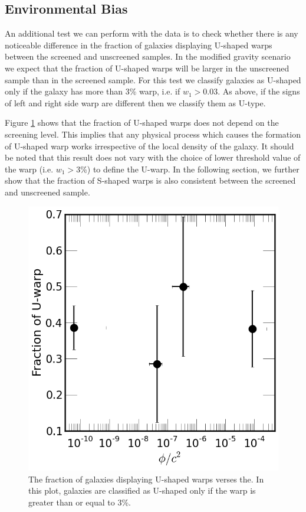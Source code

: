 \documentclass[useAMS,usenatbib,twocolumn]{mn2e}
\begin{document}
\subsection{Environmental Bias}
An additional test we can perform with the data is to check whether there is
any noticeable difference in the fraction of galaxies displaying
U-shaped warps between the screened and unscreened samples.
In the modified gravity scenario we expect
that the fraction of U-shaped warps will be larger in the unscreened sample
than in the screened sample. For this test we classify galaxies as U-shaped
only if the galaxy has more than 3\% warp, i.e. if
$w_1 > 0.03$. As above, if the signs of left and right side warp
are different then we classify them as U-type.

Figure \ref{fig:warp-stren-frac} shows that the fraction of U-shaped
warps does not depend on the screening level. This implies that any
physical process which causes the formation of
U-shaped warp works irrespective of the local
density of the galaxy. It should be noted that this result does not vary with
the choice of lower threshold value of the warp (i.e. $w_1 > 3$\%) to define
the U-warp.  In the following section, we further show that the fraction
of S-shaped warps is also consistent between the screened and unscreened
sample.


\begin{figure}
\begin{center}
\includegraphics[scale=0.35]{figures/warp-frac-vs-environ.png}
\caption{The fraction of galaxies displaying U-shaped warps
  verses the. In this plot, galaxies are classified as U-shaped only
  if the warp is greater than or equal to 3\%.}
\label{fig:warp-stren-frac}
\end{center}
\end{figure}
\end{document}
